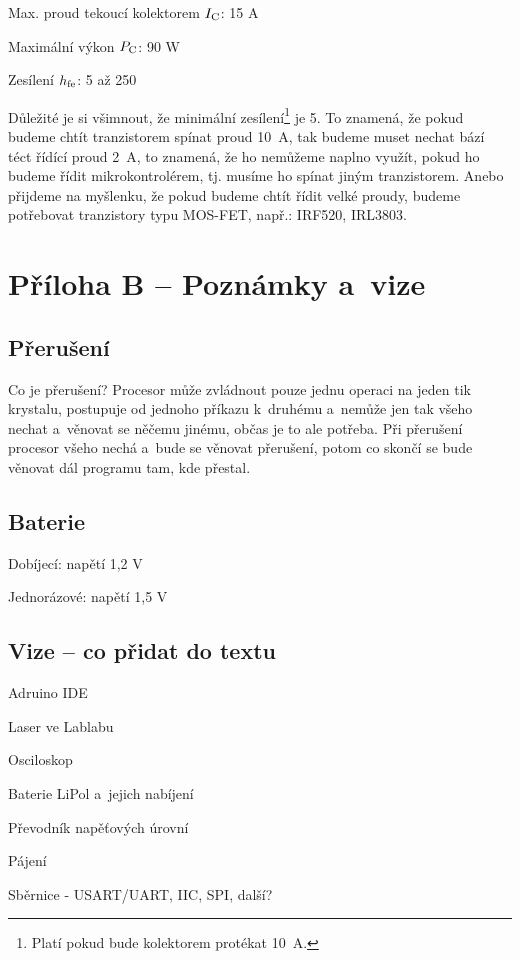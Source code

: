 Max. proud tekoucí kolektorem $I \rm _C$: 15 A

Maximální výkon $P \rm _C$: 90 W

Zesílení $h \rm _{fe}$: 5 až 250

Důležité je si všimnout, že minimální zesílení\footnote{Platí pokud bude kolektorem protékat 10~A.}  je 5. 
To znamená, že pokud budeme chtít tranzistorem spínat proud 10~A, tak budeme muset nechat bází téct řídící proud 2~A,
 to znamená, že ho nemůžeme naplno využít, pokud ho budeme řídit mikrokontrolérem, tj. musíme ho spínat jiným tranzistorem. 
 Anebo přijdeme na myšlenku, že pokud budeme chtít řídit velké proudy, budeme potřebovat tranzistory typu MOS-FET, např.: IRF520, IRL3803.




\section*{Příloha B -- Poznámky a~vize}



\subsection*{Přerušení}

Co je přerušení? Procesor může zvládnout pouze jednu operaci na jeden tik krystalu, 
postupuje od jednoho příkazu k~druhému a~nemůže jen tak všeho nechat a~věnovat se něčemu jinému, občas je to ale potřeba.
 Při přerušení procesor všeho nechá a~bude se věnovat přerušení, potom co skončí se bude věnovat dál programu tam, kde přestal. 

\subsection*{Baterie}

Dobíjecí: napětí 1,2 V~

Jednorázové: napětí 1,5 V~
 
\subsection*{Vize -- co přidat do textu}

Adruino IDE 

Laser ve Lablabu 

Osciloskop

Baterie LiPol a~jejich nabíjení 

Převodník napěťových úrovní 

Pájení 

Sběrnice - USART/UART, IIC, SPI, další?





